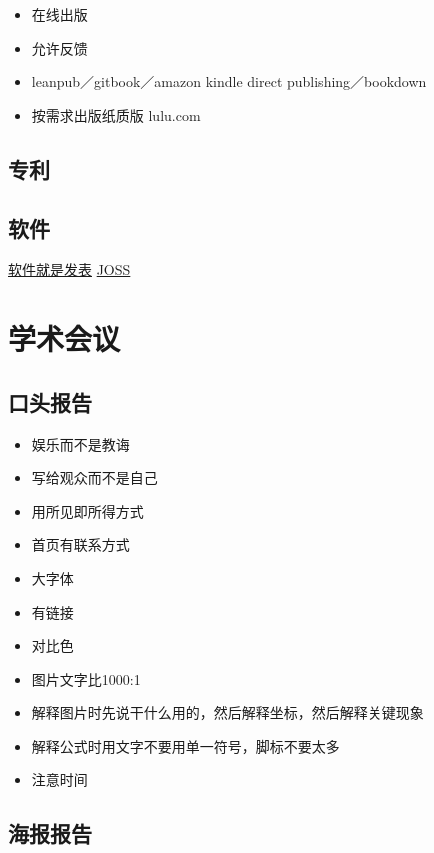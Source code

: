 \documentclass[]{book}
\providecommand{\tightlist}{%
  \setlength{\itemsep}{0pt}\setlength{\parskip}{0pt}}
\begin{document}
\begin{itemize}
\tightlist
\item
  在线出版
\item
  允许反馈
\item
  leanpub／gitbook／amazon kindle direct publishing／bookdown
\item
  按需求出版纸质版 lulu.com
\end{itemize}

\subsection{专利}

\subsection{软件}

\href{https://simplystatistics.org/2018/05/03/software-as-an-academic-publication/}{软件就是发表}
\href{http://joss.theoj.org/}{JOSS}

\section{学术会议}

\subsection{口头报告}

\begin{itemize}
\tightlist
\item
  娱乐而不是教诲
\item
  写给观众而不是自己
\item
  用所见即所得方式
\item
  首页有联系方式
\item
  大字体
\item
  有链接
\item
  对比色
\item
  图片文字比1000:1
\item
  解释图片时先说干什么用的，然后解释坐标，然后解释关键现象
\item
  解释公式时用文字不要用单一符号，脚标不要太多
\item
  注意时间
\end{itemize}

\subsection{海报报告}
\end{document}
